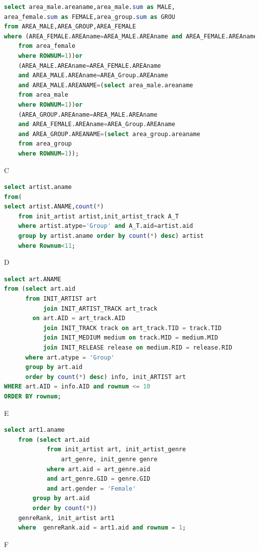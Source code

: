 \documentclass[11pt]{article} %
\begin{document}
{\begin{lstlisting}[language=SQL, keywordstyle=\color{blue!70},
commentstyle=\color{red!50!green!50!blue!50},
rulesepcolor=\color{red!20!green!20!blue!20},
frame=shadowbox]
select area_male.areaname,area_male.sum as MALE,
area_female.sum as FEMALE,area_group.sum as GROU
from AREA_MALE,AREA_GROUP,AREA_FEMALE
where (AREA_FEMALE.AREAname=AREA_MALE.AREAname and AREA_FEMALE.AREAname=AREA_Group.AREAname and AREA_FEMALE.AREANAME=(select area_female.areaname
	from area_female
	where ROWNUM=1))or 
	(AREA_MALE.AREAname=AREA_FEMALE.AREAname
	and AREA_MALE.AREAname=AREA_Group.AREAname
	and AREA_MALE.AREANAME=(select area_male.areaname
	from area_male
	where ROWNUM=1))or
	(AREA_GROUP.AREAname=AREA_MALE.AREAname
	and AREA_FEMALE.AREAname=AREA_Group.AREAname
	and AREA_GROUP.AREANAME=(select area_group.areaname
	from area_group
	where ROWNUM=1));   
\end{lstlisting}
C
\begin{lstlisting}[language=SQL, keywordstyle=\color{blue!70},
commentstyle=\color{red!50!green!50!blue!50},
rulesepcolor=\color{red!20!green!20!blue!20},
frame=shadowbox]
select artist.aname
from(
select artist.ANAME,count(*)
	from init_artist artist,init_artist_track A_T
	where artist.atype='Group' and A_T.aid=artist.aid
	group by artist.aname order by count(*) desc) artist
	where Rownum<11;
\end{lstlisting}
D
\begin{lstlisting}[language=SQL, keywordstyle=\color{blue!70},
commentstyle=\color{red!50!green!50!blue!50},
rulesepcolor=\color{red!20!green!20!blue!20},
frame=shadowbox]
select art.ANAME
from (select art.aid
      from INIT_ARTIST art 
           join INIT_ARTIST_TRACK art_track
		on art.AID = art_track.AID
           join INIT_TRACK track on art_track.TID = track.TID
           join INIT_MEDIUM medium on track.MID = medium.MID
           join INIT_RELEASE release on medium.RID = release.RID
      where art.atype = 'Group'
      group by art.aid
      order by count(*) desc) info, init_ARTIST art
WHERE art.AID = info.AID and rownum <= 10
ORDER BY rownum;
\end{lstlisting}
E
\begin{lstlisting}[language=SQL, keywordstyle=\color{blue!70},
commentstyle=\color{red!50!green!50!blue!50},
rulesepcolor=\color{red!20!green!20!blue!20},
frame=shadowbox]
select art1.aname
	from (select art.aid
			from init_artist art, init_artist_genre
				art_genre, init_genre genre
			where art.aid = art_genre.aid
			and art_genre.GID = genre.GID
			and art.gender = 'Female' 
		group by art.aid
		order by count(*))
	genreRank, init_artist art1
	where  genreRank.aid = art1.aid and rownum = 1;
\end{lstlisting}
F
\begin{lstlisting}[language=SQL, keywordstyle=\color{blue!70},
commentstyle=\color{red!50!green!50!blue!50},
rulesepcolor=\color{red!20!green!20!blue!20},
frame=shadowbox]

\end{lstlisting}}
\end{document}
